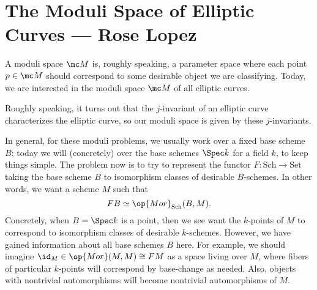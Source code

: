 \documentclass{article}
\begin{document}
\section{The Moduli Space of Elliptic Curves --- Rose Lopez}
A moduli space $\mc M$ is, roughly speaking, a parameter space where each point $p\in\mc M$ should correspond to some desirable object we are classifying. Today, we are interested in the moduli space $\mc M$ of all elliptic curves.
\begin{remark}
	Roughly speaking, it turns out that the $j$-invariant of an elliptic curve characterizes the elliptic curve, so our moduli space is given by these $j$-invariants.
\end{remark}
In general, for these moduli problems, we usually work over a fixed base scheme $B$; today we will (concretely) over the base schemes $\Spec k$ for a field $k$, to keep things simple. The problem now is to try to represent the functor $F\colon\mathrm{Sch}\to\mathrm{Set}$ taking the base scheme $B$ to isomorphism classes of desirable $B$-schemes. In other words, we want a scheme $M$ such that
\[FB\simeq\op{Mor}_{\mathrm{Sch}}(B,M).\]
Concretely, when $B=\Spec k$ is a point, then we see want the $k$-points of $M$ to correspond to isomorphism classes of desirable $k$-schemes. However, we have gained information about all base schemes $B$ here. For example, we should imagine ${\id_M}\in\op{Mor}(M,M)\cong FM$ as a space living over $M$, where fibers of particular $k$-points will correspond by base-change as needed. Also, objects with nontrivial automorphisms will become nontrivial automorphisms of $M$.
\end{document}
